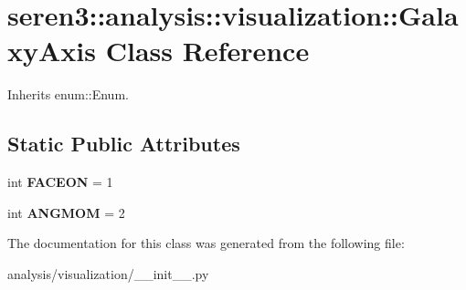 \hypertarget{classseren3_1_1analysis_1_1visualization_1_1GalaxyAxis}{
\section{seren3::analysis::visualization::GalaxyAxis Class Reference}
\label{classseren3_1_1analysis_1_1visualization_1_1GalaxyAxis}
}


Inherits enum::Enum.\subsection*{Static Public Attributes}
\begin{DoxyCompactItemize}
\item 
\hypertarget{classseren3_1_1analysis_1_1visualization_1_1GalaxyAxis_a0691dda53c171f5644dba3d44892ef1e}{
int {\bfseries FACEON} = 1}
\label{classseren3_1_1analysis_1_1visualization_1_1GalaxyAxis_a0691dda53c171f5644dba3d44892ef1e}

\item 
\hypertarget{classseren3_1_1analysis_1_1visualization_1_1GalaxyAxis_a045f3d1d4c370eab0b2020c253778f37}{
int {\bfseries ANGMOM} = 2}
\label{classseren3_1_1analysis_1_1visualization_1_1GalaxyAxis_a045f3d1d4c370eab0b2020c253778f37}

\end{DoxyCompactItemize}


The documentation for this class was generated from the following file:\begin{DoxyCompactItemize}
\item 
analysis/visualization/\_\-\_\-init\_\-\_\-.py\end{DoxyCompactItemize}
